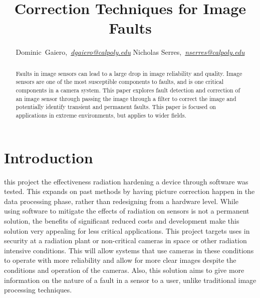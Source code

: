 \documentclass[journal]{IEEEtran}
\begin{document}
\title{Correction Techniques for Image Faults}

\author{Dominic~Gaiero,~\textit{\href{mailto:dgaiero@calpoly.edu}{dgaiero@calpoly.edu}}
        Nicholas Serres,~\textit{\href{mailto:nserres@calopoly.edu}{nserres@calpoly.edu}}}

\maketitle

\begin{abstract}
Faults in image sensors can lead to a large drop in image reliability and quality.  Image sensors are one of the most susceptible components to faults, and is one critical components in a camera system.  This paper explores fault detection and correction of an image sensor through passing the image through a filter to correct the image and potentially identify transient and permanent faults.  This paper is focused on applications in extreme environments, but applies to wider fields.   
\end{abstract}




\section{Introduction}%
 this project the effectiveness radiation hardening a device through software was tested.  This expands on past methods by having picture correction happen in the data processing phase, rather than redesigning from a hardware level. While using software to mitigate the effects of radiation on sensors is not a permanent solution, the benefits of significant reduced costs and development make this solution very appealing for less critical applications. This project targets uses in security at a radiation plant or non-critical cameras in space or other radiation intensive conditions. This will allow systems that use cameras in these conditions to operate with more reliability and allow for more clear images despite the conditions and operation of the cameras.  Also, this solution aims to give more information on the nature of a fault in a sensor to a user, unlike traditional image processing techniques.
\end{document}
